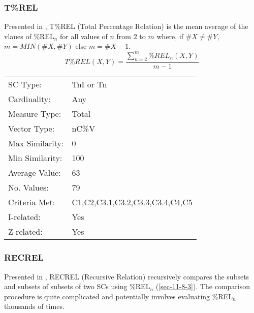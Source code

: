 \documentclass{article}
\begin{document}
\subsubsection{T\%REL}
\label{sec-11-8-4}

Presented in \citet{Castren1994}, T\%REL (Total Percentage Relation) is
the mean average of the vlaues of \%REL$_{n}$ for all values of $n$ from $2$
to $m$ where, if $\#X\neq\#Y$, $m = MIN(\#X,\#Y)$ else $m = \#X-1$.
$$T\%REL(X,Y)=\frac{\sum_{n=2}^{m}{\%REL_n\left(X,Y\right)}}{m-1}$$

\begin{center}
\begin{tabular}{ll}
 SC Type:         &  TnI or Tn                        \\
 Cardinality:     &  Any                              \\
 Measure Type:    &  Total                            \\
 Vector Type:     &  nC\%V                            \\
 Max Similarity:  &  0                                \\
 Min Similarity:  &  100                              \\
 Average Value:   &  63                               \\
 No. Values:      &  79                               \\
 Criteria Met:    &  C1,C2,C3.1,C3.2,C3.3,C3.4,C4,C5  \\
 I-related:       &  Yes                              \\
 Z-related:       &  Yes                              \\
\end{tabular}
\end{center}
\subsubsection{RECREL}
\label{sec-11-8-5}

Presented in \citet{Castren1994}, RECREL (Recursive Relation)
recursively compares the subsets and subsets of subsets of two SCs
using \%REL$_{n}$ (\ref{sec-11-8-3}). The comparison procedure is quite
complicated and potentially involves evaluating \%REL$_{n}$ thousands of
times.
\end{document}
